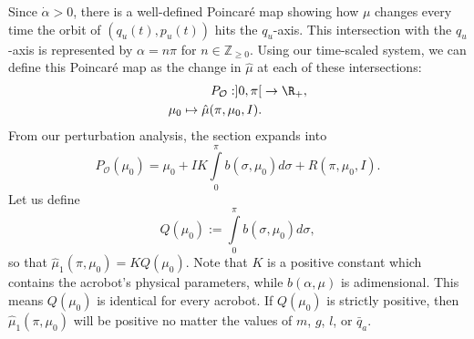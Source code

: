 %

Since \(\dot{\alpha} > 0\), there is a well-defined Poincar\'{e} map 
showing how \(\mu\) changes every time the orbit of \((q_u(t),p_u(t))\) hits the
\(q_u\)-axis.
This intersection with the \(q_u\)-axis is represented by \(\alpha = n\pi\) for
\(n \in \mathbb{Z}_{\geq 0}\).
Using our time-scaled system, we can define this Poincar\'{e} map as the change
in \(\hat{\mu}\) at each of these intersections: 
\begin{align*}
    P_\mathcal{O} : ]0,\pi[ &\rightarrow \R_+,
    \\
    \mu_0 \mapsto \hat{\mu}(\pi,\mu_0,I)
    .
\end{align*}
From our perturbation analysis, the section expands into
\[
    P_\mathcal{O}(\mu_0) = \mu_0 + I K \int\limits_0^\pi b(\sigma,\mu_0)d\sigma
    + R(\pi,\mu_0,I)
    .
\]
Let us define
\[
    Q(\mu_0) := \int \limits_0^\pi b(\sigma,\mu_0)d\sigma
    ,
\]
so that \(\hat{\mu}_1(\pi,\mu_0) = K Q(\mu_0)\).
Note that \(K\) is a positive constant which contains the acrobot's physical
parameters, while \(b(\alpha,\mu)\) is adimensional. 
This means \(Q(\mu_0)\) is identical for every acrobot.
If \(Q(\mu_0)\) is strictly positive, then \(\hat{\mu}_1(\pi,\mu_0)\) will be
positive no matter the values of \(m\), \(g\), \(l\), or \(\bar{q}_a\).

